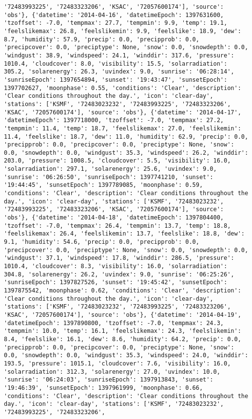\documentclass[
  letterpaper,
  DIV=11,
  numbers=noendperiod]{scrartcl}
\begin{document}
\begin{verbatim}
'72483993225', '72483323206', 'KSAC', '72057600174'], 'source': 'obs'}, {'datetime': '2014-04-16', 'datetimeEpoch': 1397631600, 'tzoffset': -7.0, 'tempmax': 27.7, 'tempmin': 9.9, 'temp': 19.1, 'feelslikemax': 26.8, 'feelslikemin': 9.9, 'feelslike': 18.9, 'dew': 8.7, 'humidity': 57.9, 'precip': 0.0, 'precipprob': 0.0, 'precipcover': 0.0, 'preciptype': None, 'snow': 0.0, 'snowdepth': 0.0, 'windgust': 38.9, 'windspeed': 24.1, 'winddir': 317.6, 'pressure': 1010.4, 'cloudcover': 8.0, 'visibility': 15.5, 'solarradiation': 305.2, 'solarenergy': 26.3, 'uvindex': 9.0, 'sunrise': '06:28:14', 'sunriseEpoch': 1397654894, 'sunset': '19:43:47', 'sunsetEpoch': 1397702627, 'moonphase': 0.55, 'conditions': 'Clear', 'description': 'Clear conditions throughout the day.', 'icon': 'clear-day', 'stations': ['KSMF', '72483023232', '72483993225', '72483323206', 'KSAC', '72057600174'], 'source': 'obs'}, {'datetime': '2014-04-17', 'datetimeEpoch': 1397718000, 'tzoffset': -7.0, 'tempmax': 27.2, 'tempmin': 11.4, 'temp': 18.7, 'feelslikemax': 27.0, 'feelslikemin': 11.4, 'feelslike': 18.7, 'dew': 11.0, 'humidity': 62.9, 'precip': 0.0, 'precipprob': 0.0, 'precipcover': 0.0, 'preciptype': None, 'snow': 0.0, 'snowdepth': 0.0, 'windgust': 35.3, 'windspeed': 26.2, 'winddir': 203.0, 'pressure': 1008.5, 'cloudcover': 5.5, 'visibility': 16.0, 'solarradiation': 297.1, 'solarenergy': 25.6, 'uvindex': 9.0, 'sunrise': '06:26:50', 'sunriseEpoch': 1397741210, 'sunset': '19:44:45', 'sunsetEpoch': 1397789085, 'moonphase': 0.59, 'conditions': 'Clear', 'description': 'Clear conditions throughout the day.', 'icon': 'clear-day', 'stations': ['KSMF', '72483023232', '72483993225', '72483323206', 'KSAC', '72057600174'], 'source': 'obs'}, {'datetime': '2014-04-18', 'datetimeEpoch': 1397804400, 'tzoffset': -7.0, 'tempmax': 26.4, 'tempmin': 13.7, 'temp': 18.8, 'feelslikemax': 26.4, 'feelslikemin': 13.7, 'feelslike': 18.8, 'dew': 9.1, 'humidity': 54.6, 'precip': 0.0, 'precipprob': 0.0, 'precipcover': 0.0, 'preciptype': None, 'snow': 0.0, 'snowdepth': 0.0, 'windgust': 37.1, 'windspeed': 17.8, 'winddir': 286.5, 'pressure': 1010.4, 'cloudcover': 8.3, 'visibility': 16.0, 'solarradiation': 304.8, 'solarenergy': 26.2, 'uvindex': 9.0, 'sunrise': '06:25:26', 'sunriseEpoch': 1397827526, 'sunset': '19:45:42', 'sunsetEpoch': 1397875542, 'moonphase': 0.62, 'conditions': 'Clear', 'description': 'Clear conditions throughout the day.', 'icon': 'clear-day', 'stations': ['KSMF', '72483023232', '72483993225', '72483323206', 'KSAC', '72057600174'], 'source': 'obs'}, {'datetime': '2014-04-19', 'datetimeEpoch': 1397890800, 'tzoffset': -7.0, 'tempmax': 24.3, 'tempmin': 10.0, 'temp': 16.1, 'feelslikemax': 24.3, 'feelslikemin': 8.4, 'feelslike': 16.1, 'dew': 8.6, 'humidity': 64.2, 'precip': 0.0, 'precipprob': 0.0, 'precipcover': 0.0, 'preciptype': None, 'snow': 0.0, 'snowdepth': 0.0, 'windgust': 35.3, 'windspeed': 24.0, 'winddir': 193.5, 'pressure': 1015.1, 'cloudcover': 7.6, 'visibility': 16.0, 'solarradiation': 312.3, 'solarenergy': 27.0, 'uvindex': 10.0, 'sunrise': '06:24:03', 'sunriseEpoch': 1397913843, 'sunset': '19:46:39', 'sunsetEpoch': 1397961999, 'moonphase': 0.66, 'conditions': 'Clear', 'description': 'Clear conditions throughout the day.', 'icon': 'clear-day', 'stations': ['KSMF', '72483023232', '72483993225', '72483323206', 
\end{verbatim}
\end{document}
